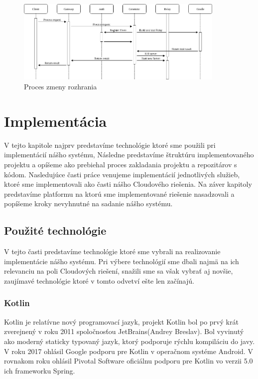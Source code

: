 \begin{figure}[!htbp]
	\centering
	\includegraphics[width=10cm]{img/api_operation_change.png}
	\caption{Proces zmeny rozhrania}
	\label{change_operation}
\end{figure}


\section{Implementácia}
V tejto kapitole najprv predstavíme technológie ktoré sme použili pri implementácií nášho systému, Následne predstavíme štruktúru implementovaného projektu a opíšeme ako prebiehal proces zakladania projektu a repozitárov s kódom. 
Nasledujúce časti práce venujeme implementácií jednotlivých služieb, ktoré sme implementovali ako časti nášho Cloudového riešenia.
Na záver kapitoly predstavíme  platformu na ktorú sme implementované riešenie nasadzovali a popíšeme kroky nevyhnutné na sadanie nášho systému.  

\subsection{Použité technológie}
V tejto časti predstavíme technológie ktoré sme vybrali na realizovanie implementácie nášho systému. Pri výbere technológií sme dbali najmä na ich relevanciu na poli Cloudových riešení, snažili sme sa však vybrať aj novšie, zaujímavé technológie ktoré v tomto odvetví ešte len začínajú. 

\subsubsection{Kotlin}
Kotlin je relatívne nový programovací jazyk, projekt Kotlin bol po prvý krát zverejnený v roku 2011 spoločnosťou JetBrains(Andrey Breslav). Bol vyvinutý ako moderný staticky typovaný jazyk, ktorý podporuje rýchlu kompiláciu do javy. V roku 2017 ohlásil Google podporu pre Kotlin v operačnom systéme Android. V rovnakom roku ohlásil Pivotal Software oficiálnu podporu pre Kotlin vo verzii 5.0 ich frameworku Spring.

